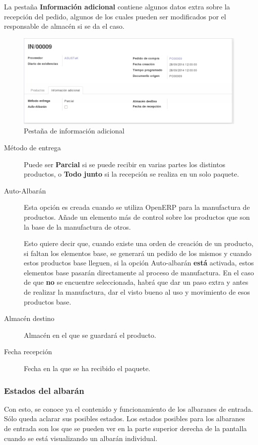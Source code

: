 \vspace{0.5cm}

La pestaña \textbf{Información adicional} contiene algunos datos extra sobre la recepción del pedido, algunos de los cuales pueden ser modificados por el responsable de almacén si se da el caso.

\begin{figure}[H]
\includegraphics[width=\textwidth]{almacen/img/alb_entrada_m.png}
\caption{Pestaña de información adicional}
\end{figure}


\begin{description}
  \item[Método de entrega] Puede ser \textbf{Parcial} si se puede recibir en varias partes los distintos productos, o \textbf{Todo junto} si la recepción se realiza en un solo paquete.
  \item[Auto-Albarán] Esta opción es creada cuando se utiliza OpenERP para la manufactura de productos. Añade un elemento más de control sobre los productos que son la base de la manufactura de otros.

Esto quiere decir que, cuando existe una orden de creación de un producto, si faltan los elementos base, se generará un pedido de los mismos y cuando estos productos base lleguen, si la opción Auto-albarán \textbf{está} activada, estos elementos base pasarán directamente al proceso de manufactura. En el caso de que \textbf{no} se encuentre seleccionada, habrá que dar un paso extra y antes de realizar la manufactura, dar el visto bueno al uso y movimiento de esos productos base.
  \item[Almacén destino] Almacén en el que se guardará el producto.
  \item[Fecha recepción] Fecha en la que se ha recibido el paquete.
\end{description}

\vspace{0.5cm}

\subsubsection{Estados del albarán}
Con esto, se conoce ya el contenido y funcionamiento de los albaranes de entrada. Sólo queda aclarar sus posibles estados. Los estados posibles para los albaranes de entrada son los que se pueden ver en la parte superior derecha de la pantalla cuando se está visualizando un albarán individual.


